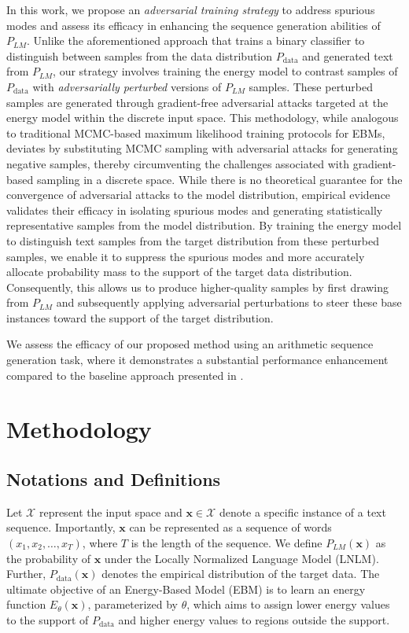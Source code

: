 \documentclass{article}
\begin{document}
 

In this work, we propose an \emph{adversarial training strategy} to address spurious modes and assess its efficacy in enhancing the sequence generation abilities of \( P_{LM} \). Unlike the aforementioned approach that trains a binary classifier to distinguish between samples from the data distribution \( P_\text{data} \) and generated text from \( P_{LM} \), our strategy involves training the energy model to contrast samples of \( P_\text{data} \) with \emph{adversarially perturbed} versions of \( P_{LM} \) samples. These perturbed samples are generated through gradient-free adversarial attacks targeted at the energy model within the discrete input space. This methodology, while analogous to traditional MCMC-based maximum likelihood training protocols for EBMs, deviates by substituting MCMC sampling with adversarial attacks for generating negative samples, thereby circumventing the challenges associated with gradient-based sampling in a discrete space. While there is no theoretical guarantee for the convergence of adversarial attacks to the model distribution, empirical evidence validates their efficacy in isolating spurious modes and generating statistically representative samples from the model distribution. By training the energy model to distinguish text samples from the target distribution from these perturbed samples, we enable it to suppress the spurious modes and more accurately allocate probability mass to the support of the target data distribution. Consequently, this allows us to produce higher-quality samples by first drawing from \( P_{LM} \) and subsequently applying adversarial perturbations to steer these base instances toward the support of the target distribution.



We assess the efficacy of our proposed method using an arithmetic sequence generation task, where it demonstrates a substantial performance enhancement compared to the baseline approach presented in \cite{deng2019residual}.


\section{Methodology}

\subsection{Notations and Definitions}
Let \( \mathcal{X} \) represent the input space and \( \mathbf{x} \in \mathcal{X} \) denote a specific instance of a text sequence. Importantly, \( \mathbf{x} \) can be represented as a sequence of words \( (x_1, x_2, \ldots, x_T) \), where \( T \) is the length of the sequence. We define \( P_{LM}(\mathbf{x}) \) as the probability of \( \mathbf{x} \) under the Locally Normalized Language Model (LNLM). Further, \( P_\text{data}(\mathbf{x}) \) denotes the empirical distribution of the target data. The ultimate objective of an Energy-Based Model (EBM) is to learn an energy function \( E_\theta(\mathbf{x}) \), parameterized by \( \theta \), which aims to assign lower energy values to the support of \( P_\text{data} \) and higher energy values to regions outside the support.
\end{document}
